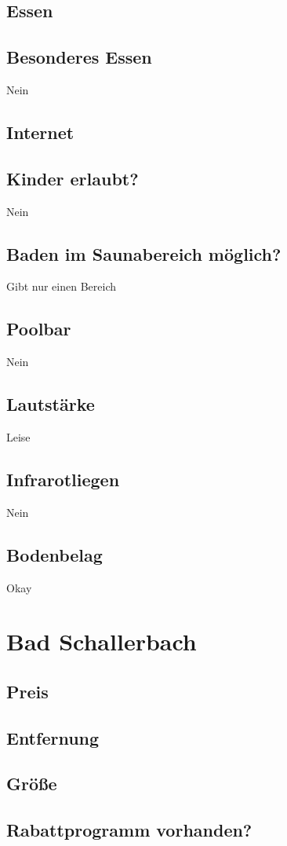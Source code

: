 \documentclass{article}
\begin{document}
\subsection*{Essen}
\subsection*{Besonderes Essen} Nein
\subsection*{Internet}
\subsection*{Kinder erlaubt?} Nein
\subsection*{Baden im Saunabereich möglich?} Gibt nur einen Bereich
\subsection*{Poolbar} Nein
\subsection*{Lautstärke} Leise
\subsection*{Infrarotliegen} Nein
\subsection*{Bodenbelag} Okay

\section*{Bad Schallerbach}
\subsection*{Preis}
\subsection*{Entfernung}
\subsection*{Größe}
\subsection*{Rabattprogramm vorhanden?}
\end{document}
